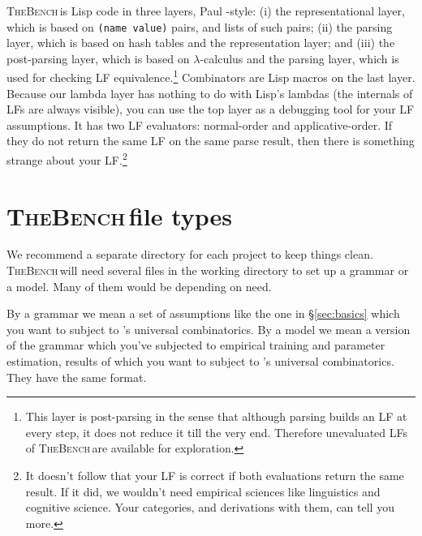\documentclass[11pt]{article}
\newcommand{\tool}{\textsc{TheBench}}
\begin{document}
\tool\,is Lisp code in three layers, Paul \citealt{grah:94}-style: (i) the representational layer, which is based on \verb|(name value)| pairs, and lists of such pairs; (ii) the parsing layer, which is based on hash tables and the representation layer; and (iii) the post-parsing layer, which is based
on $\lambda$-calculus and the parsing layer, which is used for checking LF equivalence.\footnote{This layer
is post-parsing in the sense that although parsing builds an LF at every step, it does not reduce it till the very end. Therefore
unevaluated LFs of \tool\,are available for exploration.}
Combinators are Lisp macros on the last layer.
Because our lambda layer has nothing to do with Lisp's lambdas (the internals of LFs are always visible), you can use the top layer as a debugging tool for your LF assumptions. It has two LF evaluators: normal-order and applicative-order.
If they do not return the same LF on the same parse result, then there is something strange about your LF.\footnote{It doesn't
follow that your LF is correct if both evaluations return the same result. If it did, we wouldn't need  empirical sciences
like linguistics and cognitive science.
Your categories, and derivations with them,
can tell you more.}

\section{\tool\,file types}
We recommend  a separate directory for each project to keep things clean.
\tool\,will need several files in the working directory to set up a  grammar or a model.
Many of them would be depending on need.

By a grammar
we mean a set of  assumptions like the one in \S\ref{sec:basics} which you want to subject to 's universal combinatorics.
By a model we mean a version of the grammar which you've subjected to empirical training and parameter
estimation, results of which you want to subject to 's universal combinatorics. They have the same format.
\end{document}
